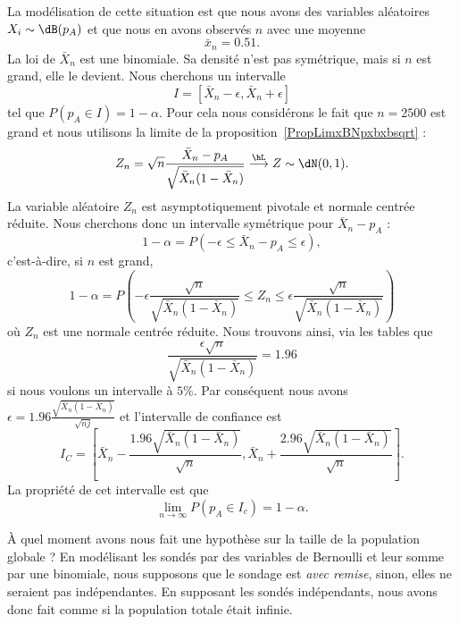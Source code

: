 La modélisation de cette situation est que nous avons des variables aléatoires \( X_i\sim\dB(p_A)\) et que nous en avons observés \( n\) avec une moyenne
\begin{equation}
	\bar x_n=0.51.
\end{equation}
La loi de \( \bar X_n\) est une binomiale. Sa densité n'est pas symétrique, mais si \( n\) est grand, elle le devient. Nous cherchons un intervalle
\begin{equation}
	I=[\bar X_n-\epsilon,\bar X_n+\epsilon]
\end{equation}
tel que \( P(p_A\in I)=1-\alpha\). Pour cela nous considérons le fait que \( n=2500\) est grand et nous utilisons la limite de la proposition~\ref{PropLimxBNpxbxbsqrt} :
\begin{equation}
	Z_n=\sqrt{n}\frac{ \bar X_n-p_A }{ \sqrt{\bar X_n(1-\bar X_n)} }\stackrel{\hL}{\longrightarrow}Z\sim\dN(0,1).
\end{equation}
La variable aléatoire \( Z_n\) est asymptotiquement pivotale et normale centrée réduite. Nous cherchons donc un intervalle symétrique pour \( \bar X_n-p_A\) :
\begin{equation}
	1-\alpha=P(-\epsilon\leq \bar X_n-p_A\leq \epsilon),
\end{equation}
c'est-à-dire, si \( n\) est grand,
\begin{equation}
	1-\alpha=P\left( -\epsilon\frac{ \sqrt{n} }{ \sqrt{\bar X_n(1-\bar X_n)} }\leq Z_n\leq\epsilon\frac{ \sqrt{n} }{ \sqrt{\bar X_n(1-\bar X_n)} } \right)
\end{equation}
où \( Z_n\) est une normale centrée réduite. Nous trouvons ainsi, via les tables que
\begin{equation}
	\frac{ \epsilon\sqrt{n} }{ \sqrt{\bar X_n(1-\bar X_n)} }=1.96
\end{equation}
si nous voulons un intervalle à \( 5\%\). Par conséquent nous avons \( \epsilon=1.96\frac{ \sqrt{\bar X_n(1-\bar X_n)} }{ \sqrt{nj} }\) et l'intervalle de confiance est
\begin{equation}
	I_C=\left[ \bar X_n-\frac{ 1.96\sqrt{\bar X_n(1-\bar X_n)} }{ \sqrt{n} },\bar X_n+\frac{ 2.96\sqrt{\bar X_n(1-\bar X_n)} }{ \sqrt{n} } \right].
\end{equation}
La propriété de cet intervalle est que
\begin{equation}
	\lim_{n\to \infty} P(p_A\in I_c)=1-\alpha.
\end{equation}

\begin{remark}
	À quel moment avons nous fait une hypothèse sur la taille de la population globale ? En modélisant les sondés par des variables de Bernoulli et leur somme par une binomiale, nous supposons que le sondage est \emph{avec remise}, sinon, elles ne seraient pas indépendantes. En supposant les sondés indépendants, nous avons donc fait comme si la population totale était infinie.
\end{remark}

